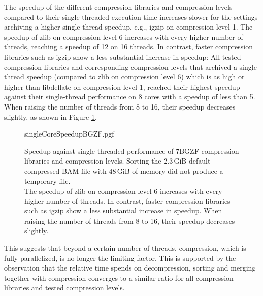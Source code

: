 The speedup of the different compression libraries and compression levels compared to their single-threaded execution time increases slower for the settings archiving a higher single-thread speedup, e.g., igzip on compression level 1. The speedup of zlib on compression level 6 increases with every higher number of threads, reaching a speedup of 12 on 16 threads. In contrast, faster compression libraries such as igzip show a less substantial increase in speedup: All tested compression libraries and corresponding compression levels that archived a single-thread speedup (compared to zlib on compression level 6) which is as high or higher than libdeflate on compression level 1, reached their highest speedup against their single-thread performance on 8 cores with a speedup of less than 5. When raising the number of threads from 8 to 16, their speedup decreases slightly, as shown in Figure \ref{fig:bgzfSngleCoreSpeedup}. 
\begin{figure}[!htb]
        {singleCoreSpeedupBGZF.pgf}
    \caption{Speedup against single-threaded performance of 7BGZF compression libraries and compression levels. Sorting the 2.3\,GiB default compressed BAM file with 48\,GiB of memory did not produce a temporary file. \\
    The speedup of zlib on compression level 6 increases with every higher number of threads. In contrast, faster compression libraries such as igzip show a less substantial increase in speedup. When raising the number of threads from 8 to 16, their speedup decreases slightly.}
    \label{fig:bgzfSngleCoreSpeedup}
\end{figure}

This suggests that beyond a certain number of threads, compression, which is fully parallelized, is no longer the limiting factor. This is supported by the observation that the relative time \sort spends on decompression, sorting and merging together with compression converges to a similar ratio for all compression libraries and tested compression levels. 

